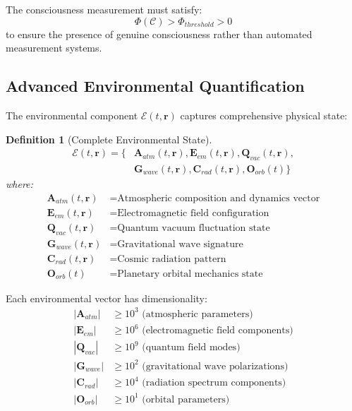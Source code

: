 \documentclass[12pt,a4paper]{article}
\newtheorem{definition}[theorem]{Definition}
\begin{document}
The consciousness measurement must satisfy:
\begin{equation}
\Phi(\mathcal{C}) > \Phi_{threshold} > 0
\end{equation}
to ensure the presence of genuine consciousness rather than automated measurement systems.

\subsection{Advanced Environmental Quantification}

The environmental component $\mathcal{E}(t,\mathbf{r})$ captures comprehensive physical state:

\begin{definition}[Complete Environmental State]
\begin{align}
\mathcal{E}(t,\mathbf{r}) = \{&\mathbf{A}_{atm}(t,\mathbf{r}), \mathbf{E}_{em}(t,\mathbf{r}), \mathbf{Q}_{vac}(t,\mathbf{r}), \\
&\mathbf{G}_{wave}(t,\mathbf{r}), \mathbf{C}_{rad}(t,\mathbf{r}), \mathbf{O}_{orb}(t)\}
\end{align}
where:
\begin{align}
\mathbf{A}_{atm}(t,\mathbf{r}) &= \text{Atmospheric composition and dynamics vector} \\
\mathbf{E}_{em}(t,\mathbf{r}) &= \text{Electromagnetic field configuration} \\
\mathbf{Q}_{vac}(t,\mathbf{r}) &= \text{Quantum vacuum fluctuation state} \\
\mathbf{G}_{wave}(t,\mathbf{r}) &= \text{Gravitational wave signature} \\
\mathbf{C}_{rad}(t,\mathbf{r}) &= \text{Cosmic radiation pattern} \\
\mathbf{O}_{orb}(t) &= \text{Planetary orbital mechanics state}
\end{align}
\end{definition}

Each environmental vector has dimensionality:
\begin{align}
|\mathbf{A}_{atm}| &\geq 10^3 \text{ (atmospheric parameters)} \\
|\mathbf{E}_{em}| &\geq 10^6 \text{ (electromagnetic field components)} \\
|\mathbf{Q}_{vac}| &\geq 10^9 \text{ (quantum field modes)} \\
|\mathbf{G}_{wave}| &\geq 10^2 \text{ (gravitational wave polarizations)} \\
|\mathbf{C}_{rad}| &\geq 10^4 \text{ (radiation spectrum components)} \\
|\mathbf{O}_{orb}| &\geq 10^1 \text{ (orbital parameters)}
\end{align}
\end{document}
